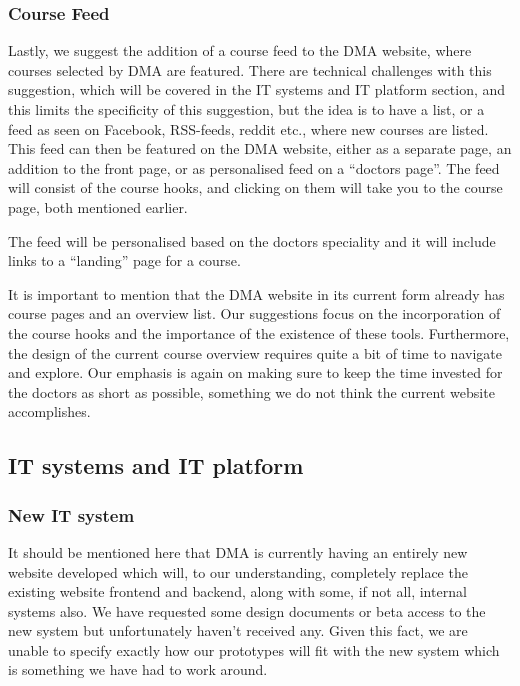 \subsubsection{Course Feed}
Lastly, we suggest the addition of a course feed to the DMA website, where courses selected by DMA are featured. There are technical challenges with this suggestion, which will be covered in the IT systems and IT platform section, and this limits the specificity of this suggestion, but the idea is to have a list, or a feed as seen on Facebook, RSS-feeds, reddit etc., where new courses are listed. This feed can then be featured on the DMA website, either as a separate page, an addition to the front page, or as personalised feed on a “doctors page”. The feed will consist of the course hooks, and clicking on them will take you to the course page, both mentioned earlier.

The feed will be personalised based on the doctors speciality and it will include links to a “landing” page for a course.

It is important to mention that the DMA website in its current form already has course pages and an overview list. Our suggestions focus on the incorporation of the course hooks and the importance of the existence of these tools. Furthermore, the design of the current course overview requires quite a bit of time to navigate and explore. Our emphasis is again on making sure to keep the time invested for the doctors as short as possible, something we do not think the current website accomplishes.

\subsection{IT systems and IT platform}
\subsubsection{New IT system}
It should be mentioned here that DMA is currently having an entirely new website developed which will, to our understanding, completely replace the existing website frontend and backend, along with some, if not all, internal systems also. We have requested some design documents or beta access to the new system but unfortunately haven’t received any. Given this fact, we are unable to specify exactly how our prototypes will fit with the new system which is something we have had to work around.


